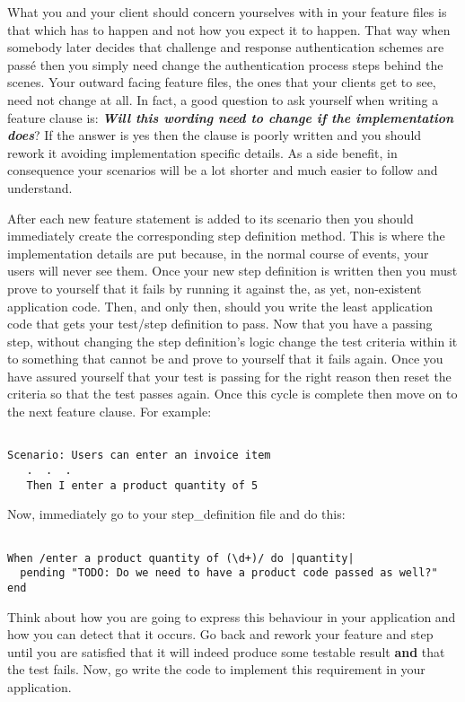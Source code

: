 \documentclass[10pt]{book}
\begin{document}
What you and your client should concern yourselves with in your feature files is that which has to happen and not how you expect it to happen.  That way when somebody later decides that challenge and response authentication schemes are passé then you simply need change the authentication process steps behind the scenes.  Your outward facing feature files, the ones that your clients get to see, need not change at all.  In fact, a good question to ask yourself when writing a feature clause is: \textbf{\emph{Will this wording need to change if the implementation does}}?  If the answer is yes then the clause is poorly written and you should rework it avoiding implementation specific details.  As a side benefit, in consequence your scenarios will be a lot shorter and much easier to follow and understand.

After each new feature statement is added to its scenario then you should immediately create the corresponding step definition method.  This is where the implementation details are put because, in the normal course of events, your users will never see them.  Once your new step definition is written then you must prove to yourself that it fails by running it against the, as yet, non-existent application code.  Then, and only then, should you write the least application code that gets your test/step definition to pass.  Now that you have a passing step, without changing the step definition's logic change the test criteria within it to something that cannot be and prove to yourself that it fails again. Once you have assured yourself that your test is passing for the right reason then reset the criteria so that the test passes again.  Once this cycle is complete then move on to the next feature clause.  For example:
\begin{verbatim}

Scenario: Users can enter an invoice item
   .  .  .
   Then I enter a product quantity of 5

\end{verbatim}

Now, immediately go to your step\_definition file and do this:
\begin{verbatim}

When /enter a product quantity of (\d+)/ do |quantity|
  pending "TODO: Do we need to have a product code passed as well?"
end

\end{verbatim}

Think about how you are going to express this behaviour in your application and how you can detect that it occurs.  Go back and rework your feature and step until you are satisfied that it will indeed produce some testable result \textbf{and} that the test fails.  Now, go write the code to implement this requirement in your application.
\end{document}
